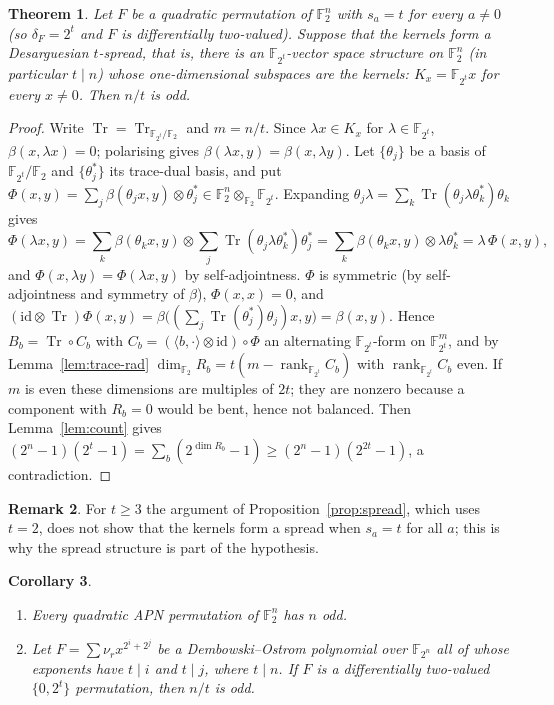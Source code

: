 \documentclass[11pt]{article}
\newtheorem{theorem}{Theorem}
\newtheorem{corollary}[theorem]{Corollary}
\theoremstyle{definition}
\newtheorem{remark}[theorem]{Remark}
\newcommand{\F}{\mathbb{F}}
\DeclareMathOperator{\Tr}{Tr}
\DeclareMathOperator{\rk}{rank}
\begin{document}
\begin{theorem}\label{thm:general-t}
Let $F$ be a quadratic permutation of $\F_2^n$ with $s_a=t$ for every $a\neq 0$ (so
$\delta_F=2^t$ and $F$ is differentially two-valued). Suppose that the kernels form a
Desarguesian $t$-spread, that is, there is an $\F_{2^t}$-vector space structure on $\F_2^n$ (in
particular $t\mid n$) whose one-dimensional subspaces are the kernels: $K_x=\F_{2^t}x$ for every
$x\neq 0$. Then $n/t$ is odd.
\end{theorem}
\begin{proof}
Write $\Tr=\Tr_{\F_{2^t}/\F_2}$ and $m=n/t$. Since $\lambda x\in K_x$ for $\lambda\in\F_{2^t}$,
$\beta(x,\lambda x)=0$; polarising gives $\beta(\lambda x,y)=\beta(x,\lambda y)$. Let
$\{\theta_j\}$ be a basis of $\F_{2^t}/\F_2$ and $\{\theta_j^*\}$ its trace-dual basis, and put
$\Phi(x,y)=\sum_j\beta(\theta_jx,y)\otimes\theta_j^*\in\F_2^n\otimes_{\F_2}\F_{2^t}$. Expanding
$\theta_j\lambda=\sum_k\Tr(\theta_j\lambda\theta_k^*)\theta_k$ gives
\[
\Phi(\lambda x,y)=\sum_k\beta(\theta_kx,y)\otimes\sum_j\Tr(\theta_j\lambda\theta_k^*)\theta_j^*
=\sum_k\beta(\theta_kx,y)\otimes\lambda\theta_k^*=\lambda\,\Phi(x,y),
\]
and $\Phi(x,\lambda y)=\Phi(\lambda x,y)$ by self-adjointness. $\Phi$ is symmetric (by
self-adjointness and symmetry of $\beta$), $\Phi(x,x)=0$, and
$(\mathrm{id}\otimes\Tr)\Phi(x,y)=\beta\bigl((\sum_j\Tr(\theta_j^*)\theta_j)x,y\bigr)=\beta(x,y)$.
Hence $B_b=\Tr\circ C_b$ with $C_b=(\langle b,\cdot\rangle\otimes\mathrm{id})\circ\Phi$ an
alternating $\F_{2^t}$-form on $\F_{2^t}^m$, and by Lemma~\ref{lem:trace-rad}
$\dim_{\F_2}R_b=t(m-\rk_{\F_{2^t}}C_b)$ with $\rk_{\F_{2^t}}C_b$ even. If $m$ is even these
dimensions are multiples of $2t$;
they are nonzero because a component with $R_b=0$ would be bent, hence not balanced. Then
Lemma~\ref{lem:count} gives $(2^n-1)(2^t-1)=\sum_b(2^{\dim R_b}-1)\ge(2^n-1)(2^{2t}-1)$, a
contradiction.
\end{proof}
\begin{remark}
For $t\ge 3$ the argument of Proposition~\ref{prop:spread}, which uses $t=2$, does not show that
the kernels form a spread when $s_a=t$ for all $a$; this is why the spread structure is part of
the hypothesis.
\end{remark}
\begin{corollary}\label{cor:general-t}
\begin{enumerate}
\item[(i)] Every quadratic APN permutation of $\F_2^n$ has $n$ odd.
\item[(ii)] Let $F=\sum\nu_rx^{2^i+2^j}$ be a Dembowski--Ostrom polynomial over $\F_{2^n}$ all of
whose exponents have $t\mid i$ and $t\mid j$, where $t\mid n$. If $F$ is a differentially
two-valued $\{0,2^t\}$ permutation, then $n/t$ is odd.
\end{enumerate}
\end{corollary}
\end{document}
